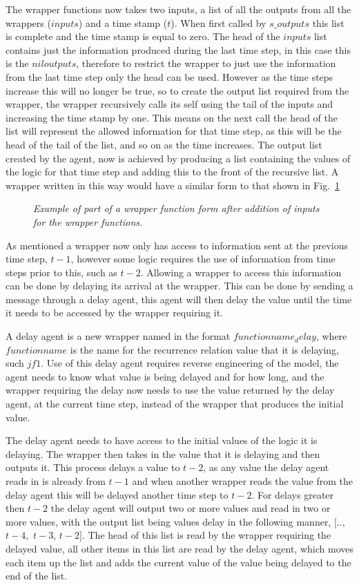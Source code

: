 \documentclass{article}
\begin{document}
The wrapper functions now takes two inputs, a list of all the outputs from all the wrappers ($inputs$) and a time stamp ($t$). When first called by $s\_outputs$ this list is complete and the time stamp is equal to zero. The head of the $inputs$ list contains just the information produced during the last time step, in this case this is the $niloutputs$, therefore to restrict the wrapper to just use the information from the last time step only the head can be used. However as the time steps increase this will no longer be true, so to create the output list required from the wrapper, the wrapper recursively calls its self using the tail of the inputs and increasing the time stamp by one. This means on the next call the head of the list will represent the allowed information for that time step, as this will be the head of the tail of the list, and so on as the time increases. The output list created by the agent, now is achieved by producing a list containing the values of the logic for that time step and adding this to the front of the recursive list. A wrapper written in this way would have a similar form to that shown in Fig.~\ref{fig:wrap4}
\begin{figure}[H]
	\centering
	
	\caption{\it Example of part of a wrapper function form after addition of inputs for the wrapper functions.}
	\label{fig:wrap4}
\end{figure} 

As mentioned a wrapper now only has access to information sent at the previous time step, $t-1$, however some logic requires the use of information from time steps prior to this, such as $t-2$. Allowing a wrapper to access this information can be done by delaying its arrival at the wrapper. This can be done by sending a message through a delay agent, this agent will then delay the value until the time it needs to be accessed by the wrapper requiring it.  

A delay agent is a new wrapper named in the format $functionname_delay$, where $functionname$ is the name for the recurrence relation value that it is delaying, such $jf1$. Use of this delay agent requires reverse engineering of the model, the agent needs to know what value is being delayed and for how long, and the wrapper requiring the delay now needs to use the value returned by the delay agent, at the current time step, instead of the wrapper that produces the initial value.

The delay agent needs to have access to the initial values of the logic it is delaying. The wrapper then takes in the value that it is delaying and then outputs it. This process delays a value to $t-2$, as any value the delay agent reads in is already from $t-1$ and when another wrapper reads the value from the delay  agent this will be delayed another time step to $t-2$. For delays greater then $t-2$ the delay agent will output two or more values and read in two or more values, with the output list being values delay in the following manner, $[..,$ $t-4,$ $t-3$, $t-2]$. The head of this list is read by the wrapper requiring the delayed value, all other items in this list are read by the delay agent, which moves each item up the list and adds the current value of the value being delayed to the end of the list. 
\end{document}
